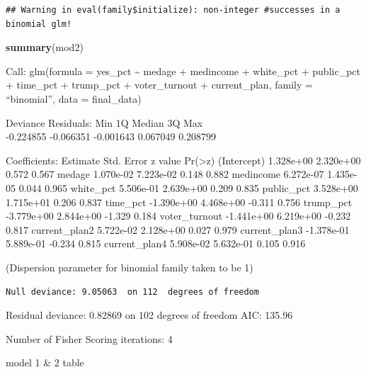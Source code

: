 \documentclass[
]{article}
\newenvironment{Shaded}{\begin{snugshade}}{\end{snugshade}}
\newcommand{\KeywordTok}[1]{\textcolor[rgb]{0.13,0.29,0.53}{\textbf{#1}}}
\newcommand{\NormalTok}[1]{#1}
\begin{document}
\begin{verbatim}
## Warning in eval(family$initialize): non-integer #successes in a binomial glm!
\end{verbatim}

\begin{Shaded}
\begin{Highlighting}[]
\KeywordTok{summary}\NormalTok{(mod2)}
\end{Highlighting}
\end{Shaded}

Call: glm(formula = yes\_pct \textasciitilde{} medage + medincome +
white\_pct + public\_pct + time\_pct + trump\_pct + voter\_turnout +
current\_plan, family = ``binomial'', data = final\_data)

Deviance Residuals: Min 1Q Median 3Q Max\\
-0.224855 -0.066351 -0.001643 0.067049 0.208799

Coefficients: Estimate Std. Error z value
Pr(\textgreater\textbar z\textbar) (Intercept) 1.328e+00 2.320e+00 0.572
0.567 medage 1.070e-02 7.223e-02 0.148 0.882 medincome 6.272e-07
1.435e-05 0.044 0.965 white\_pct 5.506e-01 2.639e+00 0.209 0.835
public\_pct 3.528e+00 1.715e+01 0.206 0.837 time\_pct -1.390e+00
4.468e+00 -0.311 0.756 trump\_pct -3.779e+00 2.844e+00 -1.329 0.184
voter\_turnout -1.441e+00 6.219e+00 -0.232 0.817 current\_plan2
5.722e-02 2.128e+00 0.027 0.979 current\_plan3 -1.378e-01 5.889e-01
-0.234 0.815 current\_plan4 5.908e-02 5.632e-01 0.105 0.916

(Dispersion parameter for binomial family taken to be 1)

\begin{verbatim}
Null deviance: 9.05063  on 112  degrees of freedom
\end{verbatim}

Residual deviance: 0.82869 on 102 degrees of freedom AIC: 135.96

Number of Fisher Scoring iterations: 4

model 1 \& 2 table
\end{document}
